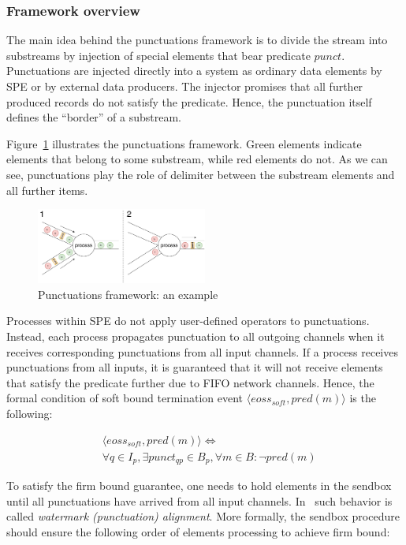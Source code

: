 \subsubsection{Framework overview}

The main idea behind the punctuations framework is to divide the stream into substreams by injection of special elements that bear predicate $punct$. Punctuations are injected directly into a system as ordinary data elements by SPE or by external data producers. The injector promises that all further produced records do not satisfy the predicate. Hence, the punctuation itself defines the ``border'' of a substream.

Figure~\ref{punctuations_scheme} illustrates the punctuations framework. Green elements indicate elements that belong to some substream, while red elements do not. As we can see, punctuations play the role of delimiter between the substream elements and all further items.

\begin{figure}[htbp]
  \centering
  \includegraphics[width=0.50\textwidth]{pics/punctuations-scheme.pdf}
  \caption{Punctuations framework: an example}
  \label{punctuations_scheme}
\end{figure}

Processes within SPE do not apply user-defined operators to punctuations. Instead, each process propagates punctuation to all outgoing channels when it receives corresponding punctuations from all input channels. If a process receives punctuations from all inputs, it is guaranteed that it will not receive elements that satisfy the predicate further due to FIFO network channels. Hence, the formal condition of soft bound termination event $\langle eoss_{soft}, pred(m)\rangle$ is the following:

\begin{align*}
& \langle eoss_{soft}, pred(m)\rangle \Longleftrightarrow \\ 
& \forall q \in I_p, \exists punct_{qp} \in B_p, \forall m\in B : \neg pred(m)
\end{align*}

To satisfy the firm bound guarantee, one needs to hold elements in the sendbox until all punctuations have arrived from all input channels. In~\cite{Carbone:2017:SMA:3137765.3137777} such behavior is called {\em watermark (punctuation) alignment}. More formally, the sendbox procedure should ensure the following order of elements processing to achieve firm bound:

